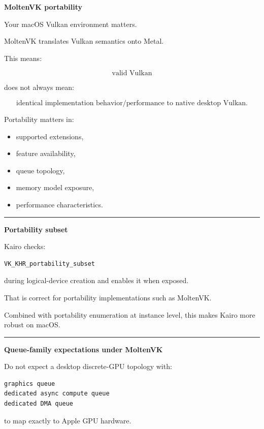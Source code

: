 \textbf{MoltenVK portability}

Your macOS Vulkan environment matters.

MoltenVK translates Vulkan semantics onto Metal.

This means:

\[
\boxed{
\text{valid Vulkan}
}
\]

does not always mean:

\[
\boxed{
\text{identical implementation behavior/performance to native desktop Vulkan}.
}
\]

Portability matters in:

\begin{itemize}
\tightlist
\item
  supported extensions,
\item
  feature availability,
\item
  queue topology,
\item
  memory model exposure,
\item
  performance characteristics.
\end{itemize}

\begin{center}\rule{0.5\linewidth}{0.5pt}\end{center}

\textbf{Portability subset}

Kairo checks:

\begin{verbatim}
VK_KHR_portability_subset
\end{verbatim}

during logical-device creation and enables it when exposed.

That is correct for portability implementations such as MoltenVK.

Combined with portability enumeration at instance level, this makes Kairo more robust on macOS.

\begin{center}\rule{0.5\linewidth}{0.5pt}\end{center}

\textbf{Queue-family expectations under MoltenVK}

Do not expect a desktop discrete-GPU topology with:

\begin{verbatim}
graphics queue
dedicated async compute queue
dedicated DMA queue
\end{verbatim}

to map exactly to Apple GPU hardware.

